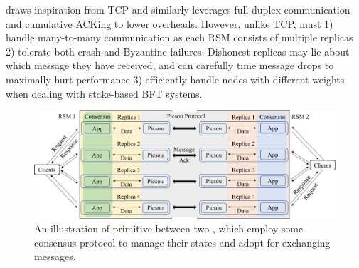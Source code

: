 \Scrooge{}  draws inspiration from TCP and similarly leverages full-duplex communication and cumulative ACKing to lower overheads. However, unlike TCP, \Scrooge{} must 1) handle many-to-many communication as each RSM consists of multiple replicas 2) tolerate both crash and Byzantine failures. Dishonest replicas may lie about which message they have received, and can carefully time message drops to maximally hurt performance 3) efficiently handle nodes with different weights when dealing with stake-based BFT systems.
 

\begin{figure}[t]
    \centering
    \includegraphics[width=0.85\columnwidth]{end-flow.pdf}
    \caption{An illustration of \CCC{} primitive between two , which employ some consensus protocol to manage their states and
    adopt \Scrooge{} for exchanging messages.}
    \label{fig:end-flow}
\end{figure}

